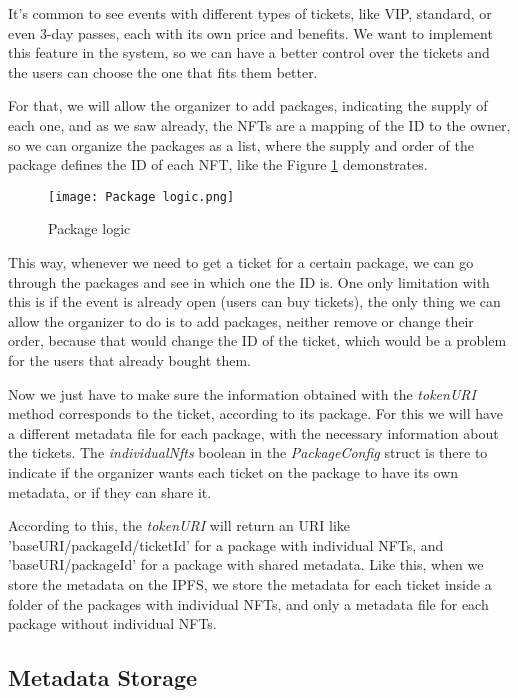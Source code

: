 It's common to see events with different types of tickets, like VIP, standard, or even 3-day passes, each with its own price and benefits. We want to implement this feature in the system, so we can have a better control over the tickets and the users can choose the one that fits them better.

For that, we will allow the organizer to add packages, indicating the supply of each one, and as we saw already, the NFTs are a mapping of the ID to the owner, so we can organize the packages as a list, where the supply and order of the package defines the ID of each NFT, like the Figure \ref{fig:package_logic} demonstrates.

\begin{figure}[H]
    \texttt{[image: Package logic.png]}
    \centering
    \caption{Package logic}
    \label{fig:package_logic}
\end{figure}

This way, whenever we need to get a ticket for a certain package, we can go through the packages and see in which one the ID is. One only limitation with this is if the event is already open (users can buy tickets), the only thing we can allow the organizer to do is to add packages, neither remove or change their order, because that would change the ID of the ticket, which would be a problem for the users that already bought them.

Now we just have to make sure the information obtained with the \textit{tokenURI} method corresponds to the ticket, according to its package. For this we will have a different metadata file for each package, with the necessary information about the tickets. The \textit{individualNfts} boolean in the \textit{PackageConfig} struct is there to indicate if the organizer wants each ticket on the package to have its own metadata, or if they can share it.

According to this, the \textit{tokenURI} will return an URI like 'baseURI/packageId/ticketId' for a package with individual NFTs, and 'baseURI/packageId' for a package with shared metadata. Like this, when we store the metadata on the IPFS, we store the metadata for each ticket inside a folder of the packages with individual NFTs, and only a metadata file for each package without individual NFTs.

\subsection{Metadata Storage}
\label{subsec:metadata_storage}

